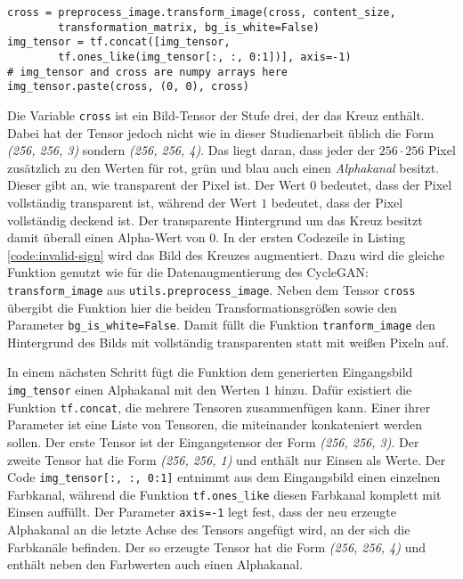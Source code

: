 \begin{code}
	\begin{verbatim}
cross = preprocess_image.transform_image(cross, content_size, 
		transformation_matrix, bg_is_white=False)
img_tensor = tf.concat([img_tensor, 
		tf.ones_like(img_tensor[:, :, 0:1])], axis=-1)
# img_tensor and cross are numpy arrays here
img_tensor.paste(cross, (0, 0), cross)
	\end{verbatim}
	\caption{\lstinline[language=python]{utils.image_augmentation.py} - Schilder als ungültig markieren}
	\label{code:invalid-sign}
\end{code}

Die Variable \texttt{cross} ist ein Bild-Tensor der Stufe drei, der das Kreuz enthält. Dabei hat der Tensor jedoch nicht wie in dieser Studienarbeit üblich die Form \emph{(256, 256, 3)} sondern \emph{(256, 256, 4)}. Das liegt daran, dass jeder der $256\cdot 256$ Pixel zusätzlich zu den Werten für rot, grün und blau auch einen \emph{Alphakanal} besitzt. Dieser gibt an, wie transparent der Pixel ist. Der Wert $0$ bedeutet, dass der Pixel vollständig transparent ist, während der Wert $1$ bedeutet, dass der Pixel vollständig deckend ist. Der transparente Hintergrund um das Kreuz besitzt damit überall einen Alpha-Wert von $0$. In der ersten Codezeile in Listing \ref{code:invalid-sign} wird das Bild des Kreuzes augmentiert. Dazu wird die gleiche Funktion genutzt wie für die Datenaugmentierung des \ac{CycleGAN}: \texttt{transform_image} aus \texttt{utils.preprocess_image}. Neben dem Tensor \texttt{cross} übergibt die Funktion hier die beiden Transformationsgrößen sowie den Parameter \texttt{bg_is_white=False}. Damit füllt die Funktion \texttt{tranform_image} den Hintergrund des Bilds mit vollständig transparenten statt mit weißen Pixeln auf.

In einem nächsten Schritt fügt die Funktion dem generierten Eingangsbild \texttt{img_tensor} einen Alphakanal mit den Werten $1$ hinzu. Dafür existiert die Funktion \texttt{tf.concat}, die mehrere Tensoren zusammenfügen kann. Einer ihrer Parameter ist eine Liste von Tensoren, die miteinander konkateniert werden sollen. Der erste Tensor ist der Eingangstensor der Form \emph{(256, 256, 3)}. Der zweite Tensor hat die Form \emph{(256, 256, 1)} und enthält nur Einsen als Werte. Der Code \texttt{img_tensor[:, :, 0:1]} entnimmt aus dem Eingangsbild einen einzelnen Farbkanal, während die Funktion \texttt{tf.ones_like} diesen Farbkanal komplett mit Einsen auffüllt. Der Parameter \texttt{axis=-1} legt fest, dass der neu erzeugte Alphakanal an die letzte Achse des Tensors angefügt wird, an der sich die Farbkanäle befinden. Der so erzeugte Tensor hat die Form \emph{(256, 256, 4)} und enthält neben den Farbwerten auch einen Alphakanal.

